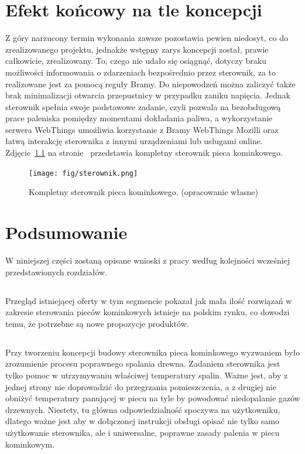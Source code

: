 \documentclass[11pt]{report}
\begin{document}
 \chapter{Efekt końcowy na tle koncepcji}
 Z góry narzucony termin wykonania zawsze pozostawia pewien niedosyt, co do zrealizowanego projektu, jednakże wstępny zarys koncepcji został, prawie całkowicie, zrealizowany. To, czego nie udało się osiągnąć, dotyczy
 braku możliwości informowania o zdarzeniach bezpośrednio przez sterownik, za to realizowane jest za pomocą reguły Bramy. Do niepowodzeń można zaliczyć także brak minimalizacji otwarcia przepustnicy w przypadku zaniku napięcia.
 Jednak sterownik spełnia swoje podstawowe zadanie, czyli pozwala na bezobsługową prace paleniska pomiędzy momentami dokładania paliwa, a wykorzystanie serwera WebThings umożliwia korzystanie z Bramy WebThings Mozilli oraz łatwą interakcję sterownika z innymi urządzeniami lub usługami online.
    Zdjęcie~\ref{fig:sterownik} na stronie~\pageref{fig:sterownik} przedstawia kompletny sterownik pieca kominkowego.
\begin{figure}[ht]
\centering
\texttt{[image: fig/sterownik.png]}
\caption{Kompletny sterownik pieca kominkowego. (opracowanie własne)}
\label{fig:sterownik}
\end{figure}
 
 
 \chapter{Podsumowanie}
W niniejszej części zostaną opisane wnioski z pracy według kolejności wcześniej przedstawionych rozdziałów.

\section{}
Przegląd istniejącej oferty w tym segmencie pokazał jak mała ilość rozwiązań w zakresie sterowania pieców kominkowych istnieje na polskim rynku, co dowodzi temu, że potrzebne są nowe propozycje produktów.
\section{}
Przy tworzeniu koncepcji budowy sterownika pieca kominkowego wyzwaniem było zrozumienie procesu poprawnego spalania drewna. Zadaniem sterownika jest tylko pomoc w utrzymywaniu właściwej temperatury spalin. Ważne jest, aby z jednej strony nie doprowadzić do przegrzania pomieszczenia, a z drugiej nie obniżyć temperatury panującej w piecu na tyle by powodować niedopalanie gazów drzewnych. Niestety, tu główna odpowiedzialność spoczywa na użytkowniku, dlatego ważne jest aby w dołączonej instrukcji obsługi opisać nie tylko samo użytkowanie sterownika, ale i uniwersalne, poprawne zasady palenia w piecu kominkowym.
\end{document}
